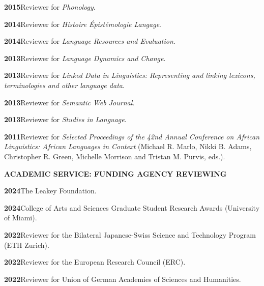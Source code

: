\documentclass[11pt]{article}
\newcommand{\hangpara}{
 \setlength{\parindent}{0in} %
 \hangindent=0.42in %
}
\begin{document}
\vskip 6pt
\hangpara
{\bf 2015}\hspace{1ex}Reviewer for \textit{Phonology}.

\vskip 6pt
\hangpara
{\bf 2014}\hspace{1ex}Reviewer for \textit{Histoire {\'E}pist{\'e}mologie Langage}.

\vskip 6pt
\hangpara
{\bf 2014}\hspace{1ex}Reviewer for \textit{Language Resources and Evaluation}.

\vskip 6pt
\hangpara
{\bf 2013}\hspace{1ex}Reviewer for \textit{Language Dynamics and Change}.

\vskip 6pt
\hangpara
{\bf 2013}\hspace{1ex}Reviewer for \textit{Linked Data in Linguistics: Representing and linking lexicons, terminologies and other language data}.

\vskip 6pt
\hangpara
{\bf 2013}\hspace{1ex}Reviewer for \textit{Semantic Web Journal}.

\vskip 6pt
\hangpara
{\bf 2013}\hspace{1ex}Reviewer for \textit{Studies in Language}.

\vskip 6pt
\hangpara
{\bf 2011}\hspace{1ex}Reviewer for \textit{Selected Proceedings of the 42nd Annual Conference on African Linguistics: African Languages in Context} (Michael R. Marlo, Nikki B. Adams, Christopher R. Green, Michelle Morrison and Tristan M. Purvis, eds.).

\vskip 20pt
\begin{flushleft}
{\bf ACADEMIC SERVICE: FUNDING AGENCY REVIEWING}
\end{flushleft}

\hangpara
{\bf 2024}\hspace{1ex}The Leakey Foundation.

\vskip 6pt
\hangpara
{\bf 2024}\hspace{1ex}College of Arts and Sciences Graduate Student Research Awards (University of Miami).

\vskip 6pt
\hangpara
{\bf 2022}\hspace{1ex}Reviewer for the Bilateral Japanese-Swiss Science and Technology Program (ETH Zurich).

\vskip 6pt
\hangpara
{\bf 2022}\hspace{1ex}Reviewer for the European Research Council (ERC).

\vskip 6pt
\hangpara
{\bf 2022}\hspace{1ex}Reviewer for Union of German Academies of Sciences and Humanities.
\end{document}
